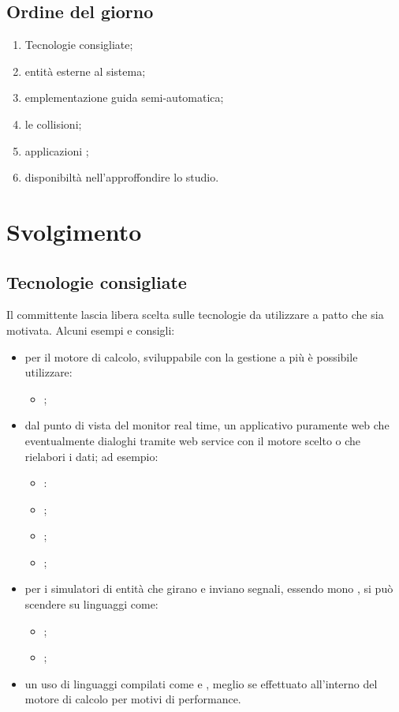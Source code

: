 \documentclass[]{article}
\begin{document}
		\subsection{Ordine del giorno}
		\begin{enumerate}
			\item Tecnologie consigliate;
			\item entità esterne al sistema;
			\item emplementazione guida semi-automatica;
			\item le collisioni;
			\item applicazioni ;
			\item disponibiltà nell'approffondire lo studio.
		\end{enumerate}

	\newpage

	\section{Svolgimento}
		\subsection{Tecnologie consigliate}
	Il committente lascia libera scelta sulle tecnologie da utilizzare a patto che sia motivata. Alcuni esempi e consigli:
	\begin{itemize}
		\item per il motore di calcolo, sviluppabile con la gestione a più  è possibile utilizzare:
		\begin{itemize}
			\item {};
		\end{itemize}
		\item dal punto di vista del  monitor real time, un applicativo puramente web che eventualmente dialoghi tramite web service con il motore scelto o che rielabori i dati; ad esempio:
		\begin{itemize}
			\item {}:
			\item {};
			\item {};
			\item {};
		\end{itemize}
		\item 	per i simulatori di entità che girano e inviano segnali, essendo mono , si può scendere su linguaggi come:
		\begin{itemize}
			\item {};
			\item {};
		\end{itemize}
		\item 	un uso di linguaggi compilati come  e , meglio se effettuato all'interno del motore di calcolo per motivi di performance.
	\end{itemize}
\end{document}
